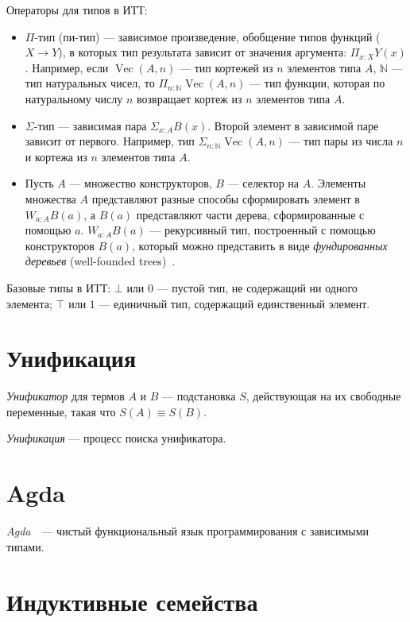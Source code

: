Операторы для типов в ИТТ:
\begin{itemize}
    \item $\Pi$-тип (пи-тип) — зависимое произведение, обобщение типов функций ($ X \to Y $),
        в которых тип результата зависит от значения аргумента: $\Pi_{x : X} Y(x)$.
        Например, если $\operatorname{Vec}(A, n)$ — тип кортежей из $n$ элементов типа $A$,
        $\mathbb N$ — тип натуральных чисел, то
        $\Pi_{n \mathbin{:} {\mathbb N}} \operatorname{Vec}(A, n)$ 
        — тип функции, которая по натуральному числу $n$ возвращает кортеж из
        $n$ элементов типа $A$.
    \item $\Sigma$-тип — зависимая пара $\Sigma_{x : A} B(x)$.
        Второй элемент в зависимой паре зависит от первого.
        Например, тип $\Sigma_{n \mathbin{:} {\mathbb N}} \operatorname{Vec}(A, n)$ — тип 
        пары из числа $n$ и кортежа из $n$ элементов типа $A$.
    \item Пусть $A$ — множество конструкторов, $B$ — селектор на $A$.
        Элементы множества $A$ представляют разные способы сформировать
элемент в $W_{a : A} B(a) $, а $B(a)$ представляют части дерева, сформированные с помощью $a$.
        $W_{a : A} B(a) $  — рекурсивный тип, построенный с помощью конструкторов $B(a)$,
        который можно представить в виде \emph{фундированных деревьев} (well-founded trees)~\cite{WTypes}.
\end{itemize}
Базовые типы в ИТТ:
$\bot$ или $0$ — пустой тип, не содержащий ни одного элемента;
$\top$ или $1$ — единичный тип, содержащий единственный элемент.

\section{Унификация}

\emph{Унификатор} для термов $A$ и $B$ — подстановка $S$, действующая на их
свободные переменные, такая что $S(A) \equiv S(B)$.

\emph{Унификация} — процесс поиска унификатора.

\section{Agda}
\emph{Agda}~\cite{AgdaLang}~—  чистый функциональный язык программирования с зависимыми типами.


\section{Индуктивные семейства}

